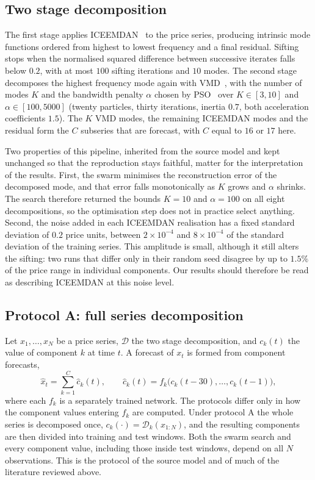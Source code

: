 \documentclass[pdflatex,sn-mathphys-num]{sn-jnl}%
\theoremstyle{thmstyleone}%
\theoremstyle{thmstyletwo}%
\theoremstyle{thmstylethree}%
\begin{document}
\subsection{Two stage decomposition}
The first stage applies ICEEMDAN~\cite{colominas2014} to the price
series, producing intrinsic mode functions ordered from highest to lowest
frequency and a final residual. Sifting stops when the normalised squared
difference between successive iterates falls below $0.2$, with at most $100$
sifting iterations and $10$ modes. The second stage decomposes the highest
frequency mode again with VMD~\cite{dragomiretskiy2014}, with the number of modes $K$
and the bandwidth penalty $\alpha$ chosen by PSO~\cite{psosurvey2022} over
$K\in[3,10]$ and $\alpha\in[100,5000]$ (twenty particles, thirty iterations,
inertia $0.7$, both acceleration coefficients $1.5$). The $K$ VMD modes, the
remaining ICEEMDAN modes and the residual form the $C$ subseries that are
forecast, with $C$ equal to $16$ or $17$ here.

Two properties of this pipeline, inherited from the source model and kept
unchanged so that the reproduction stays faithful, matter for the
interpretation of the results. First, the swarm minimises the reconstruction
error of the decomposed mode, and that error falls monotonically as $K$ grows
and $\alpha$ shrinks. The search therefore returned the bounds $K=10$ and
$\alpha=100$ on all eight decompositions, so the optimisation step does not in
practice select anything. Second, the noise added in each ICEEMDAN realisation
has a fixed standard deviation of $0.2$ price units, between
$2\times10^{-4}$ and $8\times10^{-4}$ of the standard deviation of the
training series. This amplitude is small, although it still alters the
sifting: two runs that differ only in their random seed disagree by up to
$1.5\%$ of the price range in individual components. Our results should
therefore be read as describing ICEEMDAN at this noise level.

\subsection{Protocol A: full series decomposition}
Let $x_1,\dots,x_N$ be a price series, $\mathcal{D}$ the two stage
decomposition, and $c_k(t)$ the value of component $k$ at time $t$. A
forecast of $x_t$ is formed from component forecasts,
\begin{equation}
\hat{x}_t=\sum_{k=1}^{C}\hat{c}_k(t),\qquad
\hat{c}_k(t)=f_k\bigl(c_k(t-30),\dots,c_k(t-1)\bigr),
\label{eq:ensemble}
\end{equation}
where each $f_k$ is a separately trained network. The protocols differ only in
how the component values entering $f_k$ are computed. Under protocol A the
whole series is decomposed once, $c_k(\cdot)=\mathcal{D}_k(x_{1:N})$, and the
resulting components are then divided into training and test windows. Both the
swarm search and every component value, including those inside test windows,
depend on all $N$ observations. This is the protocol of the source model and of
much of the literature reviewed above.
\end{document}
